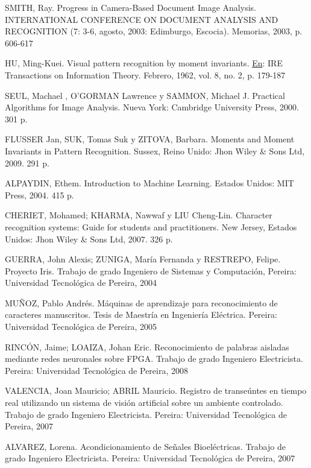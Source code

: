 \documentclass[a4paper, 11pt, oneside]{report}
\begin{document}
	SMITH, Ray. Progress in Camera-Based Document Image Analysis. INTERNATIONAL CONFERENCE ON DOCUMENT ANALYSIS AND RECOGNITION (7: 3-6, agosto, 2003: Edimburgo, Escocia). Memorias, 2003, p. 606-617
	
	HU, Ming-Kuei. Visual pattern recognition by moment invariants. \underline{En}: IRE Transactions on Information Theory. Febrero, 1962, vol. 8, no. 2, p. 179-187
	
	SEUL, Machael , O'GORMAN Lawrence y SAMMON, Michael J. Practical Algorithms for Image Analysis. Nueva York: Cambridge University Press, 2000. 301 p.
	
	FLUSSER Jan, SUK, Tomas Suk y ZITOVA, Barbara. Moments and Moment Invariants in Pattern Recognition. Sussex, Reino Unido: Jhon Wiley \& Sons Ltd, 2009. 291 p.
	
	ALPAYDIN, Ethem. Introduction to Machine Learning. Estados Unidos: MIT Press, 2004. 415 p.
	
	CHERIET, Mohamed; KHARMA, Nawwaf y LIU Cheng-Lin. Character recognition systems: Guide for students and practitioners. New Jersey, Estados Unidos: Jhon Wiley \& Sons Ltd, 2007. 326 p.
	
	GUERRA, John Alexis; ZUNIGA, María Fernanda y RESTREPO, Felipe. Proyecto Iris. Trabajo de grado Ingeniero de Sistemas y Computación, Pereira: Universidad Tecnológica de Pereira, 2004
	
	MUÑOZ, Pablo Andrés. Máquinas de aprendizaje para reconocimiento de caracteres manuscritos. Tesis de Maestría en Ingeniería Eléctrica. Pereira: Universidad Tecnológica de Pereira, 2005
	
	RINCÓN, Jaime; LOAIZA, Johan Eric. Reconocimiento de palabras aisladas mediante redes neuronales sobre FPGA. Trabajo de grado Ingeniero Electricista. Pereira: Universidad Tecnológica de Pereira, 2008
	
	VALENCIA, Joan Mauricio; ABRIL Mauricio. Registro de transeúntes en tiempo real utilizando un sistema de visión artificial sobre un ambiente controlado. Trabajo de grado Ingeniero Electricista. Pereira: Universidad Tecnológica de Pereira, 2007
	
	ALVAREZ, Lorena. Acondicionamiento de Señales Bioeléctricas. Trabajo de grado Ingeniero Electricista. Pereira: Universidad Tecnológica de Pereira, 2007
\end{document}
